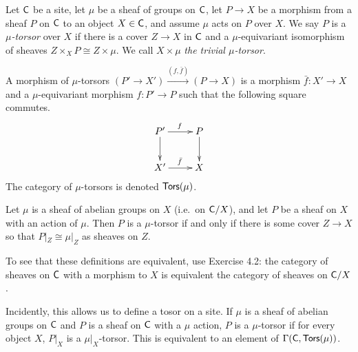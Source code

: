 \begin{definition} \label{lec30D:torsor}
 Let $\text{\sf C}$ be a site, let $\mu$ be a sheaf of groups on $\text{\sf C}$, let $P\to X$ be a morphism from a sheaf $P$ on $\text{\sf C}$ to an object $X\in \text{\sf C}$, and assume $\mu$ acts on $P$ over $X$. We say $P$ is a \emph{$\mu$-torsor} over $X$ if there is a cover $Z\to X$ in $\text{\sf C}$ and a $\mu$-equivariant isomorphism of sheaves $Z\times_X P\cong Z\times \mu$. We call $X\times \mu$ \emph{the trivial $\mu$-torsor}. 

 A morphism of $\mu$-torsors $(P'\to X')\xrightarrow{(f,\bar f)} (P\to X)$ is a morphism $\bar f:X'\to X$ and a $\mu$-equivariant morphism $f:P'\to P$ such that the following square commutes.
 \[\xymatrix{
  P'\ar[r]^{f} \ar[d] & P\ar[d]\\
  X'\ar[r]^{\bar f} & X
 }\]
 The category of $\mu$-torsors is denoted $\text{\sf Tors}(\mu)$.
\end{definition}
\begin{remark}
 Let $\mu$ is a sheaf of abelian groups on $X$ (i.e.~on $\text{\sf C}/X$), and let $P$ be a sheaf on $X$ with an action of $\mu$. Then $P$ is a $\mu$-torsor if and only if there is some cover $Z\to X$ so that $P|_Z\cong \mu|_Z$ as sheaves on $Z$.

 To see that these definitions are equivalent, use Exercise 4.2: the category of sheaves on $\text{\sf C}$ with a morphism to $X$ is equivalent the category of sheaves on $\text{\sf C}/X$.

 Incidently, this allows us to define a tosor on a site. If $\mu$ is a sheaf of abelian groups on $\text{\sf C}$ and $P$ is a sheaf on $\text{\sf C}$ with a $\mu$ action, $P$ is a $\mu$-torsor if for every object $X$, $P|_X$ is a $\mu|_X$-torsor. This is equivalent to an element of $\Gamma(\text{\sf C},\text{\sf Tors}(\mu))$.
\end{remark}

